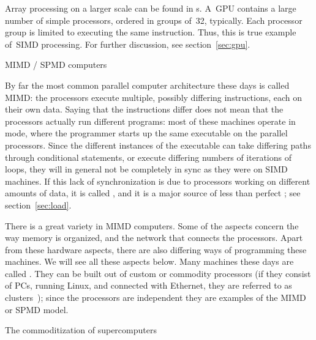 Array processing on a larger scale can be found in
s. A~\ac{GPU} contains a large number of simple
processors, ordered in groups of~32, typically. Each processor group
is limited to executing the same instruction. Thus, this is true
example of~\ac{SIMD} processing.
For further discussion, see section~\ref{sec:gpu}.

 {MIMD / SPMD computers}
\label{sec:mimd}\label{sec:spmd}

By far the most common parallel computer architecture these days is
called \acf{MIMD}: the processors execute multiple, possibly differing
instructions, each on their own data. Saying that the instructions
differ does not mean that the processors actually run different
programs: most of these machines operate in  mode, where the
programmer starts up the same executable on the parallel processors.
Since the different instances of the executable can take differing
paths through conditional statements, or execute differing numbers of
iterations of loops, they will in general not be completely in sync as
they were on \ac{SIMD} machines. If this lack of synchronization is
due to processors working on different amounts of data, it is
called , and it is a major source of less
than perfect ; see section~\ref{sec:load}.

There is a great variety in \ac{MIMD} computers. Some of the aspects
concern the way memory is organized, and the network that connects the
processors. Apart from these hardware aspects, there are also
differing ways of programming these machines. We will see all these
aspects below. Many machines these days are 
called . They can be built out of custom or
commodity processors (if they consist of PCs, running Linux, and
connected with Ethernet, they are referred to as 
{clusters}~\cite{Gropp:BeowulfBook}); since the processors are
independent they are examples of the \ac{MIMD} or \ac{SPMD} model.


 {The commoditization of supercomputers}
\label{sec:commodity}

